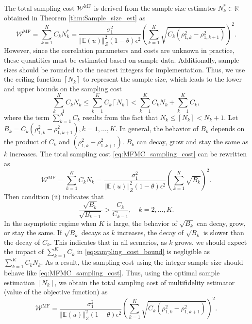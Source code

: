 \documentclass[final,3p,times,11pt]{elsarticle}
\begin{document}
The total sampling cost $\mathcal{W}^\text{MF}$ is derived from the sample size estimates
$N_k^*\in \mathbb{R}$ obtained in Theorem \ref{thm:Sample_size_est} as
%
\begin{equation}\label{eq:MFMC_sampling_cost}
    \mathcal{W}^\text{MF} = \sum_{k=1}^K C_k N_k^* = \frac{\sigma_1^2}{\left\Vert\mathbb{E}(u) \right\Vert_{Z}^2(1-\theta)\epsilon^2}\left(\sum_{k=1}^K\sqrt{C_k\left(\rho_{1,k}^2 - \rho_{1,k+1}^2\right)}\right)^2.
\end{equation}
%
However, since the correlation parameters and costs are unknown in practice, these quantities must be estimated based on sample data. Additionally, sample sizes should be rounded to the nearest integers for implementation. Thus, we use the ceiling function
$\left\lceil N_k \right\rceil$ to represent the sample size, which leads to the lower and upper bounds on the sampling cost
%
\begin{equation}\label{eq:sampling_cost_bound}
    \sum_{k=1}^K C_kN_k\le \sum_{k=1}^K C_k \left\lceil N_k\right\rceil<\sum_{k=1}^K C_kN_k + \sum_{k=1}^K C_k,
\end{equation}
%
where the term $\sum_{k=1}^K C_k$ results from the fact that $N_k\le \left\lceil N_k\right\rceil< N_k+1$. Let $B_k = C_k\left(\rho_{1,k}^2 - \rho_{1,k+1}^2\right), k=1,\dots, K$. In general, the behavior of $B_k$ depends on the product of $C_k$ and $\left(\rho_{1,k}^2 - \rho_{1,k+1}^2\right)$. $B_k$ can decay, grow and stay the same as $k$ increases. The total sampling cost \eqref{eq:MFMC_sampling_cost} can be rewritten as 
%
\begin{equation*}\label{eq:MFMC_sampling_cost_2}
    \mathcal{W}^{\text{MF}} = \sum_{k=1}^K C_k N_k = \frac{\sigma_1^2}{\left\Vert\mathbb{E}(u) \right\Vert_{Z}^2(1-\theta)\epsilon^2}\left(\sum_{k=1}^K\sqrt{B_k} \right)^2.
\end{equation*}
%
Then condition (ii) indicates that
\begin{equation}
    \frac{\sqrt{B_{k}}}{\sqrt{B_{k-1}}}>\frac{C_{k}}{C_{k-1}}, \quad k=2,\ldots,K.
\end{equation}
In the asymptotic regime when $K$ is large, the behavior of $\sqrt{B_k}$ can decay, grow, or stay the same. If $\sqrt{B_k}$ decays as $k$ increases, the decay of $\sqrt{B_k}$ is slower than the decay of $C_k$. This indicates that in all scenarios, as $k$ grows, we should expect the impact of $\sum_{k=1}^K C_k$  in \eqref{eq:sampling_cost_bound} is negligible  as $\sum_{k=1}^K C_kN_k$. As a result, the sampling cost using the integer sample size should behave like \eqref{eq:MFMC_sampling_cost}. Thus, using the optimal sample estimation $\left\lceil N_k\right\rceil$, we obtain the total sampling cost of multifidelity estimator (value of the objective function) as
\begin{equation}\label{eq:MFMC_sampling_cost_efficiency}
    \mathcal{W}^\text{MF} = \frac{\sigma_1^2}{\left\Vert\mathbb{E}(u) \right\Vert_{Z}^2(1-\theta)\epsilon^2}\left(\sum_{k=1}^K\sqrt{C_k\left(\rho_{1,k}^2 - \rho_{1,k+1}^2\right)}\right)^2.
\end{equation}
\end{document}
